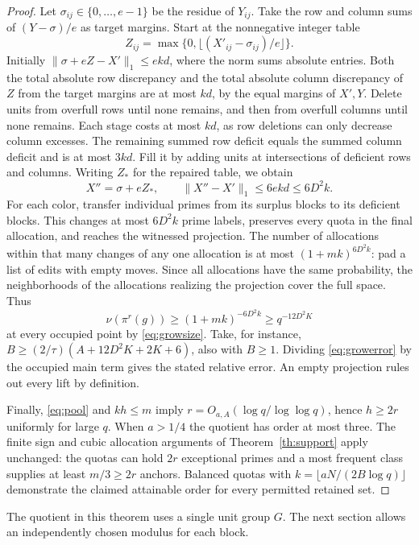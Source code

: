\begin{proof}
Let \(\sigma_{ij}\in\{0,\ldots,e-1\}\) be the residue of \(Y_{ij}\). Take the row and column sums of \((Y-\sigma)/e\) as target margins. Start at the nonnegative integer table
\[
 Z_{ij}=\max\{0,\lfloor(X'_{ij}-\sigma_{ij})/e\rfloor\}.
\]
Initially \(\|\sigma+eZ-X'\|_1\le e k d\), where the norm sums absolute entries. Both the total absolute row discrepancy and the total absolute column discrepancy of \(Z\) from the target margins are at most \(kd\), by the equal margins of \(X',Y\). Delete units from overfull rows until none remains, and then from overfull columns until none remains. Each stage costs at most \(kd\), as row deletions can only decrease column excesses. The remaining summed row deficit equals the summed column deficit and is at most \(3kd\). Fill it by adding units at intersections of deficient rows and columns. Writing \(Z_*\) for the repaired table, we obtain
\[
 X''=\sigma+e Z_*,\qquad \|X''-X'\|_1\le 6e k d\le6D^2 k.
\]
For each color, transfer individual primes from its surplus blocks to its deficient blocks. This changes at most \(6D^2 k\) prime labels, preserves every quota in the final allocation, and reaches the witnessed projection. The number of allocations within that many changes of any one allocation is at most \((1+mk)^{6D^2k}\): pad a list of edits with empty moves. Since all allocations have the same probability, the neighborhoods of the allocations realizing the projection cover the full space. Thus
\[
  \nu(\pi^r(g))\ge (1+mk)^{-6D^2 k}\ge q^{-12D^2 K}
\]
at every occupied point by \eqref{eq:growsize}. Take, for instance,
\(B\ge (2/\tau)(A+12D^2K+2K+6)\), also with \(B\ge1\). Dividing \eqref{eq:growerror} by the occupied main term gives the stated relative error. An empty projection rules out every lift by definition.

Finally, \eqref{eq:pool} and \(kh\le m\) imply \(r=O_{a,A}(\log q/\log\log q)\), hence \(h\ge2r\) uniformly for large \(q\). When \(a>1/4\) the quotient has order at most three. The finite sign and cubic allocation arguments of Theorem~\ref{th:support} apply unchanged: the quotas can hold \(2r\) exceptional primes and a most frequent class supplies at least \(m/3\ge2r\) anchors. Balanced quotas with \(k=\lfloor aN/(2B\log q)\rfloor\) demonstrate the claimed attainable order for every permitted retained set.
\end{proof}

The quotient in this theorem uses a single unit group \(G\). The next section allows an independently chosen modulus for each block.
